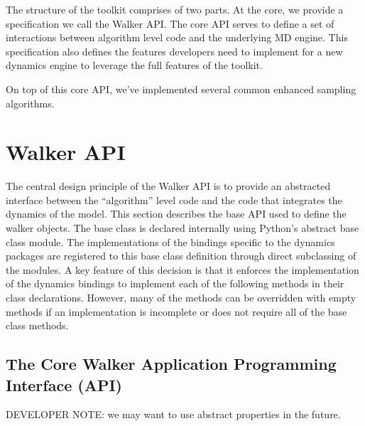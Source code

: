 \documentclass[letterpaper,10pt,english]{sphinxmanual}
\begin{document}
The structure of the toolkit comprises of two parts. At the core, we provide a specification we call the Walker API. The core API serves to define a set of interactions between algorithm level code and the underlying MD engine. This specification also defines the features developers need to implement for a new dynamics engine to leverage the full features of the toolkit.

On top of this core API, we've implemented several common enhanced sampling algorithms.


\chapter{Walker API}
\label{walker_api/walker_api.doc::doc}\label{walker_api/walker_api.doc:walker-api}
The central design principle of the Walker API is to provide an
abstracted interface between the ``algorithm'' level code and the
code that integrates the dynamics of the model. This section describes the base API used to define the walker objects. The base class is declared internally using Python's abstract base class module. The implementations of the bindings specific to the dynamics packages are registered to this base class definition through direct subclassing of the modules. A key feature of this decision is that it enforces the implementation of the dynamics bindings to implement each of the following methods in their class declarations. However, many of the methods can be overridden with empty methods if an implementation is incomplete or does not require all of the base class methods.


\section{The Core Walker Application Programming Interface (API)}
\label{walker_api/walker_api.doc:module-walker_base}\label{walker_api/walker_api.doc:the-core-walker-application-programming-interface-api}
DEVELOPER NOTE: we may want to use abstract properties in the future.
\end{document}
